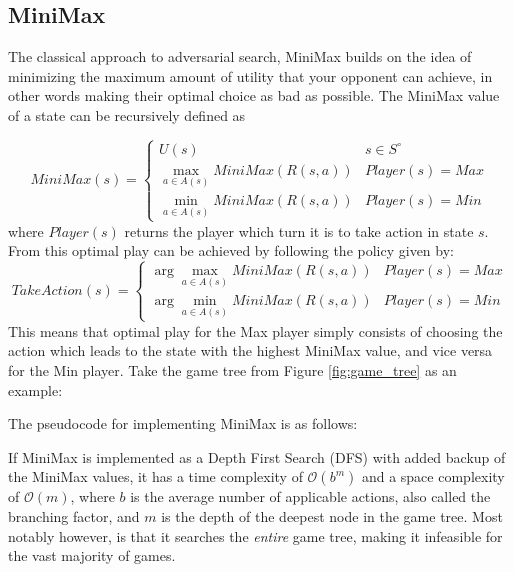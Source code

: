 \subsection{MiniMax}

The classical approach to adversarial search, MiniMax builds on the
idea of minimizing the maximum amount of utility that your opponent can
achieve, in other words making their optimal choice as bad as possible.
The MiniMax value of a state can be recursively defined as

\begin{equation}
    MiniMax(s) = \begin{cases}
        U(s) & s \in S^\circ \\
        \max_{a \in A(s)} MiniMax(R(s, a)) & Player(s) = Max \\
        \min_{a \in A(s)} MiniMax(R(s, a)) & Player(s) = Min
    \end{cases}
    \label{eq:MiniMax}
\end{equation}
where $Player(s)$ returns the player which turn it is to take action in
state $s$. From this optimal play can be achieved by following the policy
given by:
\begin{equation}
    TakeAction(s) = \begin{cases}
        \arg\max_{a \in A(s)} MiniMax(R(s, a)) & Player(s) = Max \\
        \arg\min_{a \in A(s)} MiniMax(R(s, a)) & Player(s) = Min
    \end{cases}
    \label{eq:MiniMax_policy}
\end{equation}
This means that optimal play for the Max player simply consists of choosing
the action which leads to the state with the highest MiniMax value, and
vice versa for the Min player. Take the game tree from Figure \ref{fig:game_tree}
as an example:



The pseudocode for implementing MiniMax
is as follows:



If MiniMax is implemented as a Depth First Search (DFS) with added backup 
of the MiniMax values, it has a time complexity
of $\mathcal{O}(b^m)$ and a space complexity of $\mathcal{O}(m)$,
where $b$ is the average number of applicable actions, also called the 
branching factor, and $m$ is the depth of the deepest node in the game tree.
Most notably however, is that it searches the \textit{entire}
game tree, making it infeasible for the vast majority of games.

